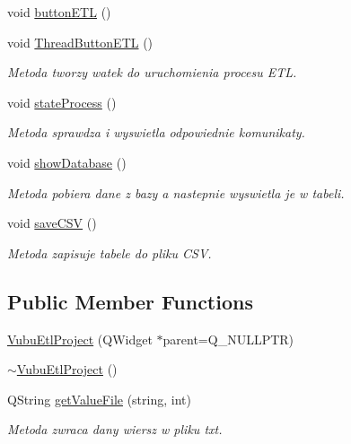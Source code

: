 \begin{DoxyCompactItemize}
void \mbox{\hyperlink{class_vubu_etl_project_a2f4f3c71af6c416ba1e3fa90adb742d1}{button\+E\+TL}} ()
\item 
void \mbox{\hyperlink{class_vubu_etl_project_a302013ec97cffed3af6caf652940c9ef}{Thread\+Button\+E\+TL}} ()
\begin{DoxyCompactList}\small\item\em Metoda tworzy watek do uruchomienia procesu E\+TL. \end{DoxyCompactList}\item 
void \mbox{\hyperlink{class_vubu_etl_project_a9f69fb3747b5ecf72d5578dc3664d9ae}{state\+Process}} ()
\begin{DoxyCompactList}\small\item\em Metoda sprawdza i wyswietla odpowiednie komunikaty. \end{DoxyCompactList}\item 
void \mbox{\hyperlink{class_vubu_etl_project_a14c0aae91d0c6e9d0f7a4c749a6a3ea2}{show\+Database}} ()
\begin{DoxyCompactList}\small\item\em Metoda pobiera dane z bazy a nastepnie wyswietla je w tabeli. \end{DoxyCompactList}\item 
void \mbox{\hyperlink{class_vubu_etl_project_a05c6d827c5dadca5127626c6ed6a4ce2}{save\+C\+SV}} ()
\begin{DoxyCompactList}\small\item\em Metoda zapisuje tabele do pliku C\+SV. \end{DoxyCompactList}\end{DoxyCompactItemize}
\subsection*{Public Member Functions}
\begin{DoxyCompactItemize}
\item 
\mbox{\hyperlink{class_vubu_etl_project_abec4bd15669ef0f9090cd3b30dcee4ed}{Vubu\+Etl\+Project}} (Q\+Widget $\ast$parent=Q\+\_\+\+N\+U\+L\+L\+P\+TR)
\item 
\mbox{\hyperlink{class_vubu_etl_project_acdf754deee05e28e8f35682e5b863aab}{$\sim$\+Vubu\+Etl\+Project}} ()
\item 
Q\+String \mbox{\hyperlink{class_vubu_etl_project_aa98aca375afb86994b80a5b88e113a8d}{get\+Value\+File}} (string, int)
\begin{DoxyCompactList}\small\item\em Metoda zwraca dany wiersz w pliku txt. \end{DoxyCompactList}\end{DoxyCompactItemize}
